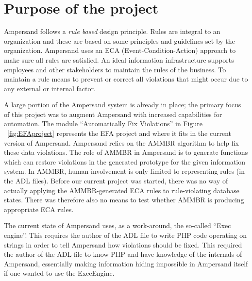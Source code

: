 %

\section{Purpose of the project}

Ampersand follows a \emph{rule based} design principle. Rules are integral to an organization
and these are based on some principles and guidelines set by the organization.
Ampersand uses an ECA (Event-Condition-Action) approach to make sure all rules are satisfied. An ideal information infrastructure supports employees and other stakeholders to maintain the rules of the business. To maintain a rule means to prevent or correct all violations that might occur due to any external or internal factor.
 
 A large portion of the Ampersand system is already in place; the primary focus of this project was to
augment Ampersand with increased capabilities for automation. The module ``Automatically Fix Violations'' in Figure ~\ref{fig:EFAproject} represents the EFA project and where it fits in the current version of Ampersand.
Ampersand relies on the AMMBR \citep{Ampersand} algorithm to help fix these data violations. 
The role 
of AMMBR in Ampersand is to generate functions which can restore violations
in the generated prototype for the given information system. In AMMBR, human involvement is only limited 
to representing rules (in the ADL files). Before our current project was started, there was no way of actually
applying the AMMBR-generated ECA rules to rule-violating database states.
There was therefore also no means to test whether AMMBR is producing
appropriate ECA rules.

The current state of Ampersand uses, as a work-around, the so-called
``Exec engine''. This requires the author of the ADL file 
to write PHP code operating on strings in order to tell Ampersand
how violations should be fixed. This required the author of the 
ADL file to know PHP and have knowledge of the internals of Ampersand,
essentially making information hiding impossible in Ampersand itself if one wanted to use
the ExecEngine. 
 

